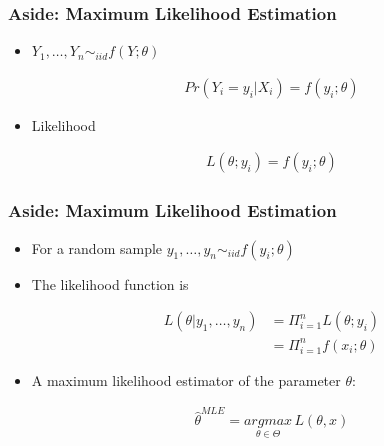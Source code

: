 \documentclass[
  shownotes,
  xcolor={svgnames},
  hyperref={colorlinks,citecolor=DarkBlue,linkcolor=andesred,urlcolor=DarkBlue}
  , aspectratio=169]{beamer}
\begin{document}
\begin{frame}[fragile]
\frametitle{Aside: Maximum Likelihood Estimation}

\begin{itemize}
\item $Y_1,\dots,Y_n\sim_{iid}f(Y;\theta)$

\begin{align}
Pr(Y_i =y_i | X_i) =f(y_i;\theta)
\end{align}

\item Likelihood

\begin{align}
L(\theta;y_i)=f(y_i;\theta)
\end{align}
\end{itemize}

 \end{frame}
\begin{frame}[fragile]
\frametitle{Aside: Maximum Likelihood Estimation}

\begin{itemize}
\item For a random sample $y_1,\dots,y_n\sim_{iid}f(y_i;\theta)$
\medskip
\item The likelihood function is



\begin{align}\label{eq:1}
L(\theta|y_1,\dots,y_n) &= \Pi_{i=1}^n L(\theta;y_i) \\ \nonumber
                        &=\Pi_{i=1}^n f(x_i;\theta)
\end{align}

\item A maximum likelihood estimator of the parameter $\theta$:

\begin{align}
\hat \theta^{MLE}=\underset{\theta \in \Theta}{argmax}\, L(\theta,x)
\end{align}
\end{itemize}


 \end{frame}
\end{document}
